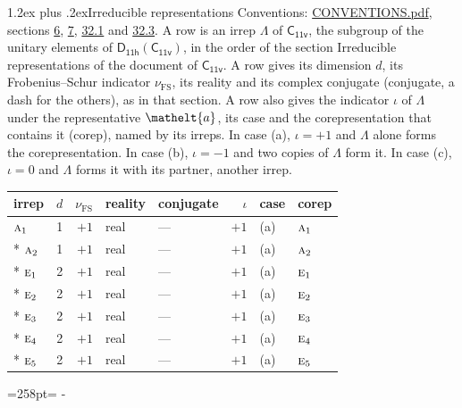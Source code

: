 \documentclass[10pt,a4paper]{article}
\makeatletter
\renewcommand\section{\@startsection{section}{1}{\z@}{-3ex plus -1ex minus -.2ex}%
  {1.2ex plus .2ex}{\normalfont\large\sffamily\bfseries\color{parttitle}}}
\newcommand{\needspace}[1]{\par\penalty-100\begingroup\dimen0=#1\relax\dimen2=\pagegoal
  \advance\dimen2-\pagetotal\ifdim\dimen0>\dimen2\relax\ifdim\dimen2>0pt\vfil\break\fi\fi
  \endgroup}
\numberwithin{equation}{section}
\newcommand{\eltfont}[1]{{\let\sigma\eltsigma\mathelt{#1}}}
\newcommand{\grp}[1]{\mathsf{#1}}
\newcommand{\irr}[1]{\text{\normalfont\scshape #1}}
\newcommand{\elt}[1]{\eltfont{#1}}
\newcommand{\fsind}{\nu_{\mathrm{FS}}}
\makeatother
\begin{document}
\section{Irreducible representations}\label{s:irreps}
Conventions: \href{../../CONVENTIONS.pdf}{CONVENTIONS.pdf}, sections \href{../../../rotation/CONVENTIONS.pdf\#conv.6}{6}, \href{../../../rotation/CONVENTIONS.pdf\#conv.7}{7}, \href{../../CONVENTIONS.pdf\#conv.32.1}{32.1} and \href{../../CONVENTIONS.pdf\#conv.32.3}{32.3}.
\leavevmode\label{n:irrep.Delta}A row is an irrep $\Lambda$ of $\grp{C_{11v}}$, the subgroup of the unitary elements of $\grp{D_{11h}}(\grp{C_{11v}})$, in the order of the section Irreducible representations of the document of \href{../../../rotation/data/pdf/C11v.pdf}{$\grp{C_{11v}}$}. \label{n:index.dimension}\label{n:index.frobenius}\label{n:head.irrep}\label{n:head.reality}\label{n:head.conjugate}A row gives its dimension $d$, its Frobenius--Schur indicator $\fsind$, its reality and its complex conjugate (conjugate, a dash for the others), as in that section. \label{n:head.case.corep}\label{n:head.corep}A row also gives the indicator $\iota$ of $\Lambda$ under the representative $\elt{a}$, its case and the corepresentation that contains it (corep), named by its irreps. In case (a), $\iota = +1$ and $\Lambda$ alone forms the corepresentation. In case (b), $\iota = -1$ and two copies of $\Lambda$ form it. In case (c), $\iota = 0$ and $\Lambda$ forms it with its partner, another irrep.
\setlength{\emergencystretch}{2em}\par\setlength{\emergencystretch}{0pt}
{\small\renewcommand{\arraystretch}{1.25}\setlength{\tabcolsep}{4pt}\begin{longtable}{@{}lrrllrll@{}}\toprule
irrep & $d$ & $\fsind$ & reality & conjugate & $\iota$ & case & corep\\\midrule\endhead
\bottomrule\endfoot\endlastfoot
$\irr{a}_{1}$ & 1 & $+1$ & real & --- & $+1$ & (a) & $\irr{a}_{1}$\\*
$\irr{a}_{2}$ & 1 & $+1$ & real & --- & $+1$ & (a) & $\irr{a}_{2}$\\*
$\irr{e}_{1}$ & 2 & $+1$ & real & --- & $+1$ & (a) & $\irr{e}_{1}$\\*
$\irr{e}_{2}$ & 2 & $+1$ & real & --- & $+1$ & (a) & $\irr{e}_{2}$\\*
$\irr{e}_{3}$ & 2 & $+1$ & real & --- & $+1$ & (a) & $\irr{e}_{3}$\\*
$\irr{e}_{4}$ & 2 & $+1$ & real & --- & $+1$ & (a) & $\irr{e}_{4}$\\*
$\irr{e}_{5}$ & 2 & $+1$ & real & --- & $+1$ & (a) & $\irr{e}_{5}$\\
\bottomrule\end{longtable}}
\needspace{258pt}
\end{document}
